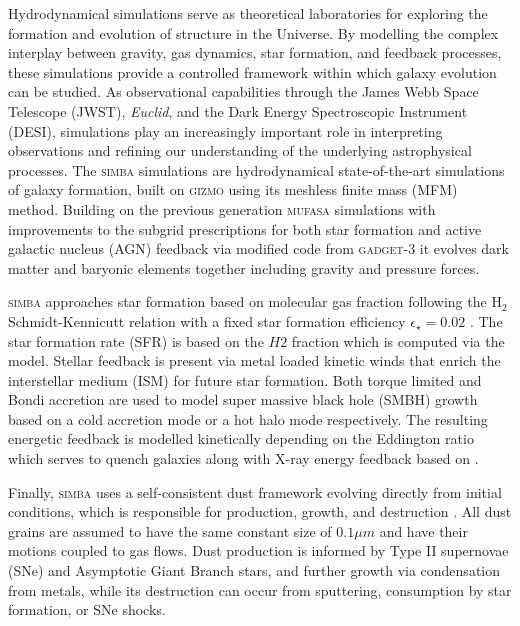 \documentclass[
    a4paper, %
    10pt, %
    unnumberedsections, %
]{LTJournalArticle}
\begin{document}
Hydrodynamical simulations serve as theoretical laboratories for exploring the formation and evolution of structure in the Universe. By modelling the complex interplay between gravity, gas dynamics, star formation, and feedback processes, these simulations provide a controlled framework within which galaxy evolution can be studied. As observational capabilities through the James Webb Space Telescope (JWST), \textit{Euclid}, and the Dark Energy Spectroscopic Instrument (DESI), simulations play an increasingly important role in interpreting observations and refining our understanding of the underlying astrophysical processes. The \textsc{simba} simulations \parencite{daveSimbaCosmologicalSimulations2019} are hydrodynamical state-of-the-art simulations of galaxy formation, built on \textsc{gizmo} \parencite{hopkinsNewClassAccurate2015} using its meshless finite mass (MFM) method. Building on the previous generation \textsc{mufasa} simulations with improvements to the subgrid prescriptions for both star formation and active galactic nucleus (AGN) feedback via modified code from \textsc{gadget-3} \parencite{springelCosmologicalSimulationCode2005} it evolves dark matter and baryonic elements together including gravity and pressure forces.

\textsc{simba} approaches star formation based on molecular gas fraction following the $\mathrm{H_2}$ Schmidt-Kennicutt relation with a fixed star formation efficiency $\epsilon_\star=0.02$ \parencite{robertc.kennicuttGlobalSchmidtLaw1998}. The star formation rate (SFR) is based on the $H2$ fraction which is computed via the \cite{krumholzCOMPARISONMETHODSDETERMINING2011} model. Stellar feedback is present via metal loaded kinetic winds that enrich the interstellar medium (ISM) for future star formation. Both torque limited \parencite{angles-alcazarGravitationalTorquedrivenBlack2017} and Bondi accretion \parencite{bondiSphericallySymmetricalAccretion1952,bondiMechanismAccretionStars1944} are used to model super massive black hole (SMBH) growth based on a cold accretion mode or a hot halo mode respectively. The resulting energetic feedback is modelled kinetically depending on the Eddington ratio which serves to quench galaxies along with X-ray energy feedback based on \cite{choiRADIATIVEMOMENTUMBASEDMECHANICAL2012}.

Finally, \textsc{simba} uses a self-consistent dust framework evolving directly from initial conditions, which is responsible for production, growth, and destruction \parencite{liDusttoGasDusttoMetalsRatio2019}. All dust grains are assumed to have the same constant size of $0.1 \mu m$ and have their motions coupled to gas flows. Dust production is informed by Type II supernovae (SNe) and Asymptotic Giant Branch stars, and further growth via condensation from metals, while its destruction can occur from sputtering, consumption by star formation, or SNe shocks.
\end{document}
